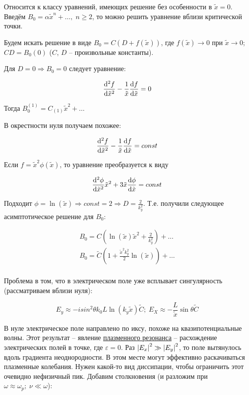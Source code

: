 \documentclass[10pt, a4paper]{article}
\begin{document}
Относится к классу уравнений, имеющих решение без особенности в $\tilde{x} = 0$. Введём $B_0 = \alpha\tilde{x}^n+\ldots,\;n\geq2$, то можно решить уравнение вблизи критической точки.

Будем искать решение в виде $B_0 = C(D+f(\tilde{x}))$, где $f(\tilde{x})\rightarrow0$ при $\tilde{x}\rightarrow0$; $CD = B_0(0)$ ($C$, $D$ -- произвольные константы).

Для $D = 0 \Rightarrow B_0 = 0$ следует уравнение:

\begin{equation*}
	\dv[2]{f}{\tilde{x}} - \frac{1}{\tilde{x}}\dv{f}{\tilde{x}} = 0
\end{equation*}

Тогда $B_0^{(1)} = C_{(1)}\tilde{x}^2+\ldots$

В окрестности нуля получаем похожее:

\begin{equation*}
	\dv[2]{f}{\tilde{x}} - \frac{1}{\tilde{x}}\dv{f}{\tilde{x}} = const
\end{equation*}

Если $f = \tilde{x}^2\phi(\tilde{x})$, то уравнение преобразуется к виду

\begin{equation*}
	\dv[2]{\phi}{\tilde{x}}\tilde{x}^2 + 3\tilde{x}\dv{\phi}{\tilde{x}} = const
\end{equation*}

Подходит $\phi = \ln(\tilde{x}) \Rightarrow const = 2 \Rightarrow D = \frac{2}{k_y^2}$. Т.е. получили следующее асимптотическое решение для $B_0$:

\begin{align*}
	B_0 = C\left(\ln(\tilde{x})\tilde{x}^2 + \frac{2}{k_y^2}\right)+\ldots \\
	B_0 = \tilde{C}\left(1 + \frac{\tilde{x}^2k_y^2}{2} \ln(\tilde{x})\right)+\ldots \\
\end{align*}

Проблема в том, что в электрическом поле уже всплывает сингулярность (рассматриваем вблизи нуля):

\begin{equation*}
	E_y \approx -isin^2\theta k_0L \ln(k_y\tilde{x})\tilde{C};\;E_X\approx-\frac{L}{\tilde{x}}\sin\theta\tilde{C}
\end{equation*}

В нуле электрическое поле направлено по иксу, похоже на квазипотенциальные волны. Этот результат -- явление \uline{плазменного резонанса} -- расхождение электрических полей в точке, где $\varepsilon = 0$. Раз $\abs{E_x}^2\gg\abs{E_y}^2$, то поле вытянулось вдоль градиента неоднородности. В этом месте могут эффективно раскачиваться плазменные колебания. Нужен какой-то вид диссипации, чтобы ограничить этот очевидно нефизичный пик. Добавим столкновения (и разложим при $\omega\approx\omega_p;\;\nu\ll\omega$):
\end{document}
